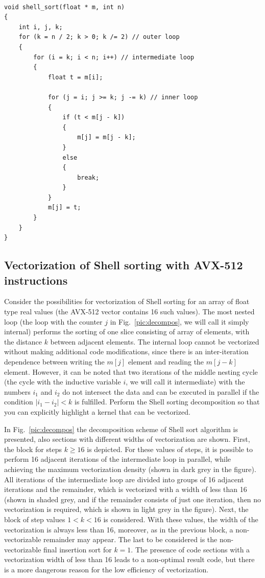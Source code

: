\documentclass[
11pt,%
tightenlines,%
twoside,%
onecolumn,%
nofloats,%
nobibnotes,%
nofootinbib,%
superscriptaddress,%
noshowpacs,%
centertags]%
{revtex4}
\begin{document}
\begin{lstlisting}[caption={Shell sorting},label={lst:shellsort}]

void shell_sort(float * m, int n)
{
	int i, j, k;
	for (k = n / 2; k > 0; k /= 2) // outer loop
	{
		for (i = k; i < n; i++) // intermediate loop
		{
			float t = m[i];
	
			for (j = i; j >= k; j -= k) // inner loop
			{
				if (t < m[j - k])
				{
					m[j] = m[j - k];
				}
				else
				{
					break;
				}
			}
			m[j] = t;
		}
	}
}
\end{lstlisting}

\subsection{Vectorization of Shell sorting with AVX-512 instructions}

Consider the possibilities for vectorization of Shell sorting for an array of float type real values (the AVX-512 vector contains 16 such values).
The most nested loop (the loop with the counter $ j $ in Fig.~\ref{pic:decompos}, we will call it simply internal) performs the sorting of one slice consisting of array of elements, with the distance $ k $ between adjacent elements.
The internal loop cannot be vectorized without making additional code modifications, since there is an inter-iteration dependence between writing the $ m [j] $ element and reading the $ m [j - k] $ element. However, it can be noted that two iterations of the middle nesting cycle (the cycle with the inductive variable $ i $, we will call it intermediate) with the numbers $ i_1 $ and $ i_2 $ do not intersect the data and can be executed in parallel if the condition $ | i_1 - i_2 | < k $ is fulfilled.
Perform the Shell sorting decomposition so that you can explicitly highlight a kernel that can be vectorized.

In Fig.~\ref{pic:decompos} the decomposition scheme of Shell sort algorithm is presented, also sections with different widths of vectorization are shown.
First, the block for steps $ k \ge 16 $ is depicted.
For these values of steps, it is possible to perform 16 adjacent iterations of the intermediate loop in parallel, while achieving the maximum vectorization density (shown in dark grey in the figure).
All iterations of the intermediate loop are divided into groups of 16 adjacent iterations and the remainder, which is vectorized with a width of less than 16 (shown in shaded grey, and if the remainder consists of just one iteration, then no vectorization is required, which is shown in light grey in the figure).
Next, the block of step values $ 1 < k < 16 $ is considered.
With these values, the width of the vectorization is always less than 16, moreover, as in the previous block, a non-vectorizable remainder may appear.
The last to be considered is the non-vectorizable final insertion sort for $ k = 1 $.
The presence of code sections with a vectorization width of less than 16 leads to a non-optimal result code, but there is a more dangerous reason for the low efficiency of vectorization.
\end{document}
